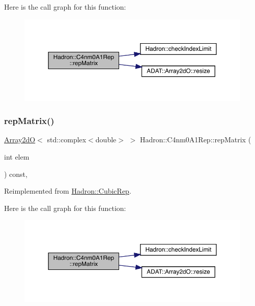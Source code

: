 Here is the call graph for this function\+:
\nopagebreak
\begin{figure}[H]
\begin{center}
\leavevmode
\includegraphics[width=350pt]{d8/d28/structHadron_1_1C4nm0A1Rep_a18af771ed96478090f052459dd7a70da_cgraph}
\end{center}
\end{figure}
\mbox{\label{structHadron_1_1C4nm0A1Rep_a18af771ed96478090f052459dd7a70da}} 
\subsubsection{\texorpdfstring{repMatrix()}{repMatrix()}\hspace{0.1cm}{\footnotesize\ttfamily [2/3]}}
{\footnotesize\ttfamily \mbox{\hyperlink{classADAT_1_1Array2dO}{Array2dO}}$<$ std\+::complex$<$double$>$ $>$ Hadron\+::\+C4nm0\+A1\+Rep\+::rep\+Matrix (\begin{DoxyParamCaption}\item[{int}]{elem }\end{DoxyParamCaption}) const\hspace{0.3cm}{\ttfamily [inline]}, {\ttfamily [virtual]}}



Reimplemented from \mbox{\hyperlink{structHadron_1_1CubicRep_ac5d7e9e6f4ab1158b5fce3e4ad9e8005}{Hadron\+::\+Cubic\+Rep}}.

Here is the call graph for this function\+:
\nopagebreak
\begin{figure}[H]
\begin{center}
\leavevmode
\includegraphics[width=350pt]{d8/d28/structHadron_1_1C4nm0A1Rep_a18af771ed96478090f052459dd7a70da_cgraph}
\end{center}
\end{figure}
\mbox{\label{structHadron_1_1C4nm0A1Rep_a18af771ed96478090f052459dd7a70da}} 
